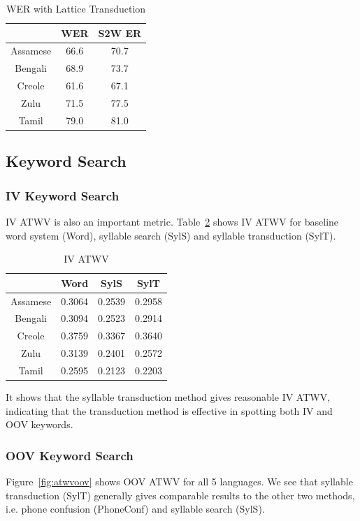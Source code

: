 \documentclass[journal]{IEEEtran}
\begin{document}
\begin{table}[!t]
  \caption{WER with Lattice Transduction}
  \label{tab:WER}
  \centering
  \begin{tabular}{ccc}
    \hline
              & WER     & S2W ER \\
    \hline
    Assamese  & 66.6    & 70.7 \\
    Bengali   & 68.9    & 73.7 \\
    Creole    & 61.6    & 67.1 \\
    Zulu      & 71.5    & 77.5 \\
    Tamil     & 79.0    & 81.0 \\
    \hline
  \end{tabular}
\end{table}

\subsection{Keyword Search}
\subsubsection{IV Keyword Search}
IV ATWV is also an important metric. Table~\ref{tab:ivatwv} 
shows IV ATWV for baseline word system (Word), syllable search (SylS) and syllable transduction (SylT).
\begin{table}[!t]
  \caption{IV ATWV}
  \label{tab:ivatwv}
  \centering
  \begin{tabular}{cccc}
    \hline
              & Word & SylS  & SylT  \\
    \hline
    Assamese  & 0.3064 & 0.2539 & 0.2958 \\
    Bengali   & 0.3094 & 0.2523 & 0.2914 \\
    Creole    & 0.3759 & 0.3367 & 0.3640 \\
    Zulu      & 0.3139 & 0.2401 & 0.2572 \\
    Tamil     & 0.2595 & 0.2123 & 0.2203 \\
    \hline
  \end{tabular}
\end{table}
It shows that the syllable transduction method gives reasonable IV ATWV, indicating that the 
transduction method is effective in spotting both IV and OOV keywords.

\subsubsection{OOV Keyword Search}
Figure~\ref{fig:atwvoov} shows OOV ATWV for all 5 languages. We see that syllable transduction (SylT) 
generally gives comparable results to the other two methods, i.e. phone confusion (PhoneConf) and syllable search (SylS).
\end{document}

